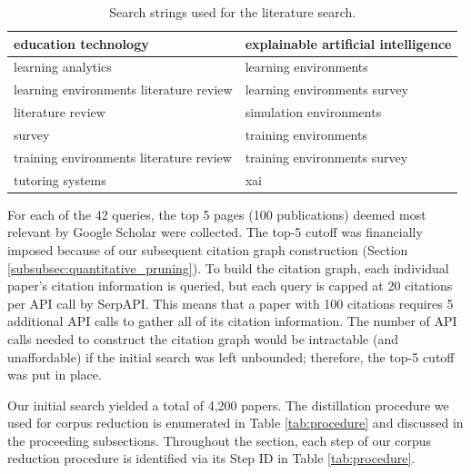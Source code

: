 \documentclass[manuscript,screen,review]{acmart}
\begin{document}
\begin{table}[htbp]
    \renewcommand{\arraystretch}{1.3}%
    \centering
    \caption{Search strings used for the literature search.}
    \begin{tabularx}{\linewidth}{l@{\hskip .25in} l@{\hskip .25in}}
    
        \midrule
        education technology & explainable artificial intelligence \\

        \midrule
        learning analytics & learning environments \\
        
        \midrule
        learning environments literature review & learning environments survey \\
    
        \midrule
        literature review & simulation environments \\
        
        \midrule
        survey & training environments \\
        
        \midrule
        training environments literature review & training environments survey \\
        
        \midrule
        tutoring systems & xai \\

        \bottomrule
    \end{tabularx}
    \label{tab:search_terms}
\end{table}

For each of the 42 queries, the top 5 pages (100 publications) deemed most relevant by Google Scholar were collected. The top-5 cutoff was financially imposed because of our subsequent citation graph construction (Section \ref{subsubsec:quantitative_pruning}). To build the citation graph, each individual paper's citation information is queried, but each query is capped at 20 citations per API call by SerpAPI. This means that a paper with 100 citations requires 5 additional API calls to gather all of its citation information. The number of API calls needed to construct the citation graph would be intractable (and unaffordable) if the initial search was left unbounded; therefore, the top-5 cutoff was put in place.

Our initial search yielded a total of 4,200 papers. The distillation procedure we used for corpus reduction is enumerated in Table \ref{tab:procedure} and discussed in the proceeding subsections. Throughout the section, each step of our corpus reduction procedure is identified via its Step ID in Table \ref{tab:procedure}.
\end{document}

